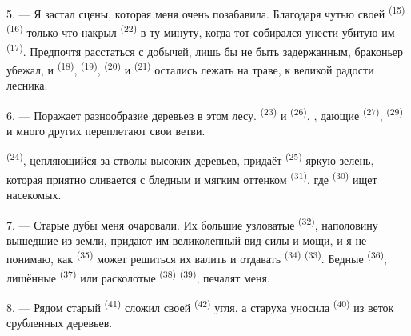 5. --- Я застал  сцены, которая меня очень позабавила.
Благодаря чутью своей  \textsuperscript{(15)} 
\textsuperscript{(16)} только что накрыл  \textsuperscript{(22)} в
ту минуту, когда тот собирался унести убитую им 
\textsuperscript{(17)}. Предпочтя расстаться с добычей, лишь бы не быть
задержанным, браконьер убежал, и  \textsuperscript{(18)},
 \textsuperscript{(19)},  \textsuperscript{(20)} и
 \textsuperscript{(21)} остались лежать на траве, к великой радости
лесника.

6. --- Поражает разнообразие деревьев в этом лесу. 
\textsuperscript{(23)} и  \textsuperscript{(26)}, , дающие
 \textsuperscript{(27)},  \textsuperscript{(29)} и много
других переплетают свои ветви.

 \textsuperscript{(24)}, цепляющийся за стволы высоких деревьев,
придаёт  \textsuperscript{(25)} яркую зелень,
которая приятно сливается с бледным и мягким оттенком 
\textsuperscript{(31)}, где  \textsuperscript{(30)} ищет
насекомых.

\VUsaut{3.0mm}
\VUsaut{3.0mm}

7. --- Старые дубы меня очаровали. Их большие узловатые 
\textsuperscript{(32)}, наполовину вышедшие из земли, придают им великолепный вид
силы и мощи, и я не понимаю, как  \textsuperscript{(35)} может
решиться их валить и отдавать  \textsuperscript{(34)}
 \textsuperscript{(33)}. Бедные 
\textsuperscript{(36)}, лишённые  \textsuperscript{(37)} или расколотые
 \textsuperscript{(38)}  \textsuperscript{(39)},
печалят меня.

8. --- Рядом старый  \textsuperscript{(41)} сложил своей
  \textsuperscript{(42)} угля, а старуха уносила
 \textsuperscript{(40)}  из веток срубленных
деревьев.

\VUsaut{3.0mm}
\VUsaut{3.0mm}

